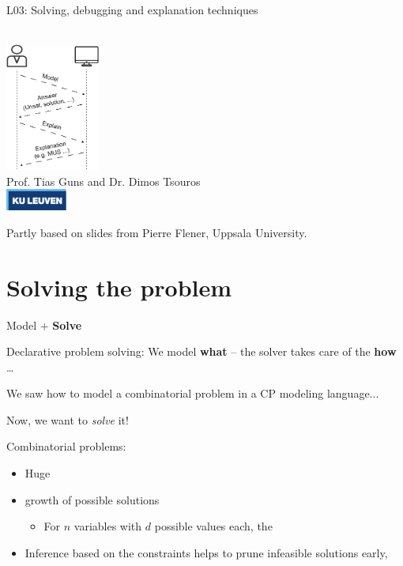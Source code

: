 \documentclass{cons-beamer}
\begin{document}
\begin{frame}{L03: Solving, debugging and explanation techniques}
  \begin{center}
    ~ \\
    \includegraphics[height=42mm]{images/texpl_img/interaction_figure4.png} \\
    Prof. Tias Guns and Dr. Dimos Tsouros \\[0.5em]
    \includegraphics[width=2cm]{images/kuleuven_CMYK_logo.pdf}
  \end{center}
  
  {\footnotesize 
  Partly based on slides from Pierre Flener, Uppsala University.}
\end{frame}


\section{Solving the problem}

\begin{frame}{Model + \textbf{Solve}}

  Declarative problem solving: We model \textbf{what} -- the solver takes care of the \textbf{how} \dots   \vfill

  We saw how to model a combinatorial problem in a CP modeling language... 
  \vfill

  Now, we want to \textit{solve} it! \vfill
  
  Combinatorial problems:
  \begin{itemize}
    \item  Huge 
    \item {} growth of possible solutions
    \begin{itemize}
      \item For \( n \) variables with \( d \) possible values each, the 
    \end{itemize}
    \item Inference based on the constraints helps to prune infeasible solutions early, 
  \end{itemize}
\end{frame}
\end{document}
